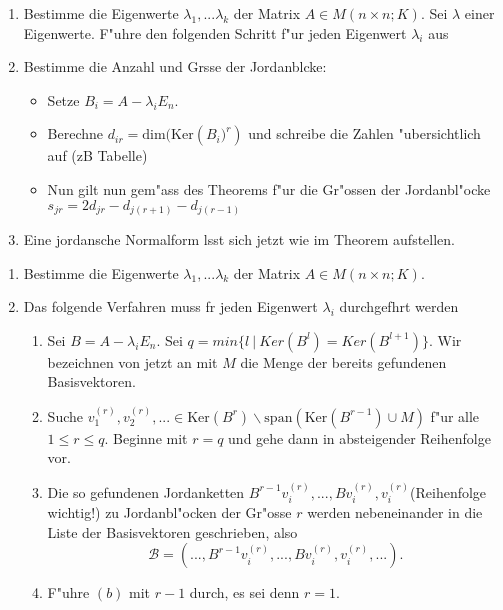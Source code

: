 \documentclass[8pt, a4paper, twocolumn, landscape]{article}
\begin{document}
\begin{remark}
\begin{enumerate}
\item Bestimme die Eigenwerte $\lambda_1, ... \lambda_k$ der Matrix $A \in M(n \times n; K)$. Sei $\lambda$ einer Eigenwerte. F"uhre den folgenden Schritt f"ur jeden Eigenwert $\lambda_i$ aus
\item  Bestimme die Anzahl und Gr\oee sse der Jordanbl\oee cke:
\begin{itemize}
\item Setze $B_i = A - \lambda_i E_n$.
\item Berechne $d_{ir} = \mathrm{dim}(\mathrm{Ker}\left(B_i)^r\right)$ und schreibe die Zahlen "ubersichtlich auf (zB Tabelle)
\item Nun gilt nun gem"ass des Theorems f"ur die Gr"ossen der Jordanbl"ocke $s_{jr} = 2 d_{jr} - d_{j(r+1)} - d_{j(r-1)}$
\end{itemize}
\item Eine jordansche Normalform l\aee sst sich jetzt wie im Theorem aufstellen.
\end{enumerate}
\end{remark}



\begin{remark}
\begin{enumerate}
\item Bestimme die Eigenwerte $\lambda_1, ... \lambda_k$ der Matrix $A \in M(n \times n; K)$. 
\item Das folgende Verfahren muss f\uee r jeden Eigenwert $\lambda_i$ durchgef\uee hrt werden
\begin{enumerate}
\item Sei $B = A - \lambda_i E_n$. Sei $q= min\{l \ | \ Ker(B^l) = Ker(B^{l+1})\}$. Wir bezeichnen von jetzt an mit $M$ die Menge der bereits gefundenen Basisvektoren.
\item Suche $v_1^{(r)}, v_2^{(r)}, ... \in \mathrm{Ker}(B^r) \backslash \mathrm{span}(\mathrm{Ker}(B^{r-1}) \cup M)$ f"ur alle $1 \leq r \leq q$. Beginne  mit $r = q$  und gehe dann in absteigender Reihenfolge vor.
\item Die so gefundenen Jordanketten $B^{r-1} v_i^{(r)}, ..., B v_i^{(r)}, v_i^{(r)}$(Reihenfolge wichtig!) zu Jordanbl"ocken der Gr"osse $r$ werden nebeneinander in die Liste der Basisvektoren geschrieben, also 
$$
\mathcal{B} = ( ... , B^{r-1} v_i^{(r)}, ..., B v_i^{(r)}, v_i^{(r)}, ...).
$$
\item F"uhre $(b)$ mit $r-1$ durch, es sei denn $r = 1$. 
\end{enumerate}
\end{enumerate}
\end{remark}
\end{document}

